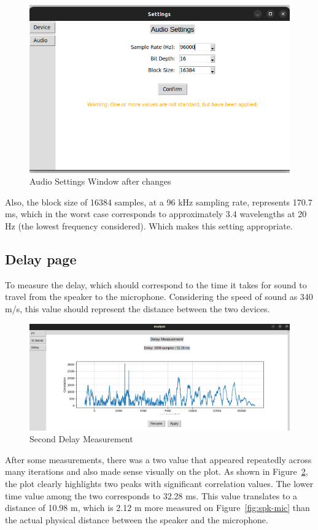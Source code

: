\begin{figure}[H]
	\centering
	\includegraphics[width=0.8
	\linewidth]{Figures/Coro_audio_settings.png}
	\caption{Audio Settings Window after changes}
	\label{fig:Coro_audio_settings}
\end{figure}

Also, the block size of 16384 samples, at a 96 kHz sampling rate, represents 170.7 ms, which in the worst case corresponds to approximately 3.4 wavelengths at 20 Hz (the lowest frequency considered). Which makes this setting appropriate.


\subsection{Delay page}

To measure the delay, which should correspond to the time it takes for sound to travel from the speaker to the microphone. Considering the speed of sound as 340 m/s, this value should represent the distance between the two devices.

\begin{figure}[H]
	\centering
	\includegraphics[width=0.8
	\linewidth]{Figures/Coro_delay_2.png}
	\caption{Second Delay Measurement}
	\label{fig:Coro_delay2}
\end{figure}

After some measurements, there was a two value that appeared repeatedly across many iterations and also made sense visually on the plot. As shown in Figure~\ref{fig:Coro_delay2}, the plot clearly highlights two peaks with significant correlation values. The lower time value among the two corresponds to 32.28 ms. This value translates to a distance of 10.98 m, which is 2.12 m more measured on Figure~\ref{fig:spk-mic} than the actual physical distance between the speaker and the microphone.

